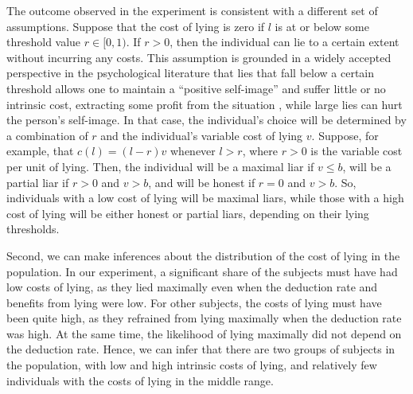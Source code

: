 \documentclass[12pt]{article}
\begin{document}
\par The outcome observed in the experiment is consistent with a different set of assumptions. Suppose that the cost of lying is zero if $l$ is at or below some threshold value $r\in[0,1)$. If $r>0$, then the individual can lie to a certain extent without incurring any costs. This assumption is grounded in a widely accepted perspective in the psychological literature that lies that fall below a certain threshold allows one to maintain a ``positive self-image'' and suffer little or no intrinsic cost, extracting some profit from the situation \citep{Shalvietal2015,GinoAriely2016},\footnotemark{} 
 while large lies can hurt the person's self-image. In that case, the individual's choice will be determined by a combination of $r$ and the individual's variable cost of lying $v$. Suppose, for example, that $c(l)=(l-r)v$ whenever $l>r$, where $r>0$ is the variable cost per unit of lying.\footnotemark{} 
Then, the individual will be a maximal liar if $v\leq b$, will be a partial liar if $r>0$ and $v>b$, and will be honest if $r=0$ and $v>b$. So, individuals with a low cost of lying will be maximal liars, while those with a high cost of lying will be either honest or partial liars, depending on their lying thresholds. 

\par Second, we can make inferences about the distribution of the cost of lying in the population. 
In our experiment, a significant share of the subjects must have had low costs of lying, as they lied maximally even when the deduction rate and benefits from lying were low. For other subjects, the costs of lying must have been quite high, as they refrained from lying maximally when the deduction rate was high. At the same time, the likelihood of lying maximally did not depend on the deduction rate. Hence, we can infer that there are two groups of subjects in the population, with low and high intrinsic costs of lying, and relatively few individuals with the costs of lying in the middle range.   
\end{document}
